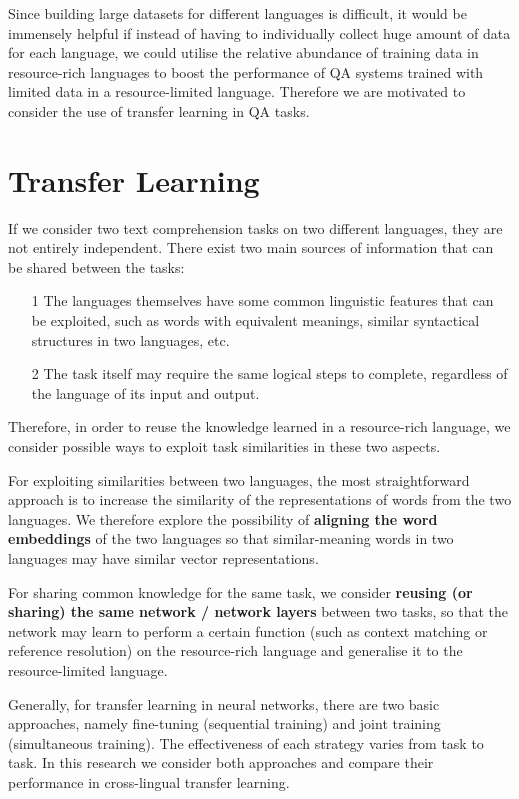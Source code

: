 \documentclass[]{article}
\begin{document}
Since building large datasets for different languages is difficult, it would be immensely helpful if instead of having to individually collect huge amount of data for each language, we could utilise the relative abundance of training data in resource-rich languages to boost the performance of QA systems trained with limited data in a resource-limited language. Therefore we are motivated to consider the use of transfer learning in QA tasks.


\section{Transfer Learning}

If we consider two text comprehension tasks on two different languages, they are not entirely independent. There exist two main sources of information that can be shared between the tasks:
\begin{itemize}
\item[1] The languages themselves have some common linguistic features that can be exploited, such as words with equivalent meanings, similar syntactical structures in two languages, etc.
\item[2] The task itself may require the same logical steps to complete, regardless of the language of its input and output.
\end{itemize}

Therefore, in order to reuse the knowledge learned in a resource-rich language, we consider possible ways to exploit task similarities in these two aspects.

For exploiting similarities between two languages, the most straightforward approach is to increase the similarity of the representations of words from the two languages. We therefore explore the possibility of \textbf{aligning the word embeddings} of the two languages so that similar-meaning words in two languages may have similar vector representations.

For sharing common knowledge for the same task, we consider \textbf{reusing (or sharing) the same network / network layers} between two tasks, so that the network may learn to perform a certain function (such as context matching or reference resolution) on the resource-rich language and generalise it to the resource-limited language. 

Generally, for transfer learning in neural networks, there are two basic approaches, namely fine-tuning (sequential training) and joint training (simultaneous training). The effectiveness of each strategy varies from task to task. In this research we consider both approaches and compare their performance in cross-lingual transfer learning.
\end{document}
